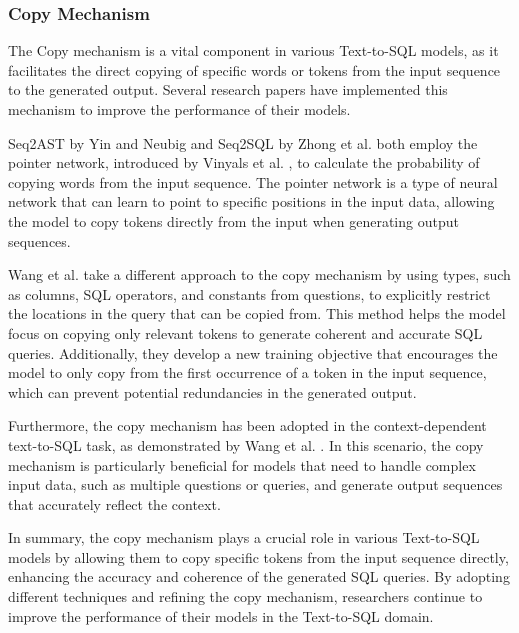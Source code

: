\subsubsection{Copy Mechanism}

The Copy mechanism is a vital component in various Text-to-SQL models, as it facilitates the direct copying of specific words or tokens from the input sequence to the generated output. Several research papers have implemented this mechanism to improve the performance of their models.

Seq2AST by Yin and Neubig  \cite{yin-neubig-2017-syntactic} and Seq2SQL by Zhong et al.  \cite{zhong_seq2sql_2017} both employ the pointer network, introduced by Vinyals et al.  \cite{vinyals2017pointer}, to calculate the probability of copying words from the input sequence. The pointer network is a type of neural network that can learn to point to specific positions in the input data, allowing the model to copy tokens directly from the input when generating output sequences.

Wang et al.  \cite{wang2017pointing} take a different approach to the copy mechanism by using types, such as columns, SQL operators, and constants from questions, to explicitly restrict the locations in the query that can be copied from. This method helps the model focus on copying only relevant tokens to generate coherent and accurate SQL queries. Additionally, they develop a new training objective that encourages the model to only copy from the first occurrence of a token in the input sequence, which can prevent potential redundancies in the generated output.

Furthermore, the copy mechanism has been adopted in the context-dependent text-to-SQL task, as demonstrated by Wang et al.  \cite{wang-etal-2020-pg}. In this scenario, the copy mechanism is particularly beneficial for models that need to handle complex input data, such as multiple questions or queries, and generate output sequences that accurately reflect the context.

In summary, the copy mechanism plays a crucial role in various Text-to-SQL models by allowing them to copy specific tokens from the input sequence directly, enhancing the accuracy and coherence of the generated SQL queries. By adopting different techniques and refining the copy mechanism, researchers continue to improve the performance of their models in the Text-to-SQL domain.